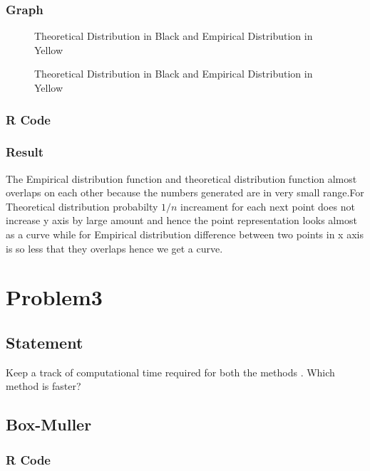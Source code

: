 \documentclass[10pt]{article}
\begin{document}
\subsubsection{Graph}
\begin{figure}[H]
		\centering
		\resizebox{0.6\linewidth}{!}{\texttt{[image: q2\_0]}}
		\caption{Theoretical Distribution in Black and Empirical Distribution in Yellow}
		\label{fig:q1_f1_a}
\end{figure}
\pagebreak
\begin{figure}[H]
		\centering
		\resizebox{0.6\linewidth}{!}{\texttt{[image: q2\_1]}}
		\caption{Theoretical Distribution in Black and Empirical Distribution in Yellow}
		\label{fig:q1_f1_a}
\end{figure}
\pagebreak
\subsubsection{R Code}



\subsubsection{Result}
The Empirical distribution function and theoretical distribution function almost overlaps on each other because the numbers generated are in very small range.For Theoretical distribution probabilty $ 1/n $ increament for each next point does not increase y axis by large amount and hence the point representation looks almost as a curve while for Empirical distribution difference between two points in x axis is so less that they overlaps hence we get a curve.
\pagebreak
\section{Problem3}
\subsection{Statement}

Keep a track of computational time required for both the methods . Which method is faster?
\subsection{Box-Muller}
\subsubsection{R Code}

\end{document}
